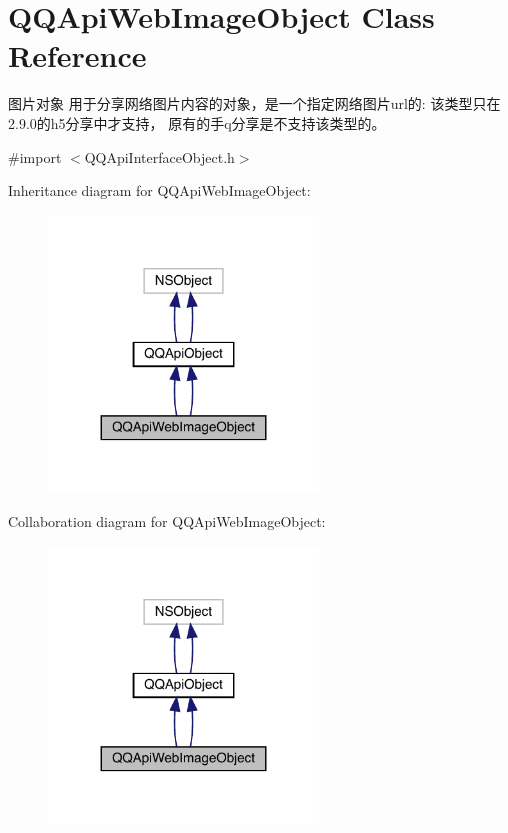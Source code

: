 \hypertarget{interface_q_q_api_web_image_object}{}\section{Q\+Q\+Api\+Web\+Image\+Object Class Reference}
\label{interface_q_q_api_web_image_object}


图片对象 用于分享网络图片内容的对象，是一个指定网络图片url的\+: 该类型只在2.9.\+0的h5分享中才支持， 原有的手q分享是不支持该类型的。  




{\ttfamily \#import $<$Q\+Q\+Api\+Interface\+Object.\+h$>$}



Inheritance diagram for Q\+Q\+Api\+Web\+Image\+Object\+:\nopagebreak
\begin{figure}[H]
\begin{center}
\leavevmode
\includegraphics[width=203pt]{interface_q_q_api_web_image_object__inherit__graph}
\end{center}
\end{figure}


Collaboration diagram for Q\+Q\+Api\+Web\+Image\+Object\+:\nopagebreak
\begin{figure}[H]
\begin{center}
\leavevmode
\includegraphics[width=203pt]{interface_q_q_api_web_image_object__coll__graph}
\end{center}
\end{figure}
